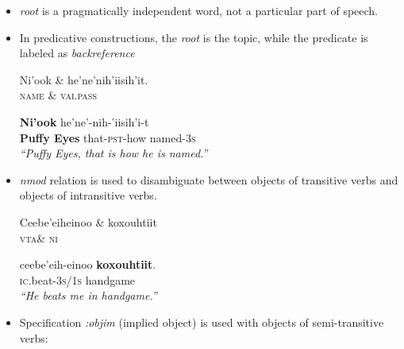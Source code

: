 \documentclass[portrait,a0paper,fontscale=0.36]{baposter} %
\newcommand{\compresslist}{ %
\setlength{\itemsep}{1pt}
\setlength{\parskip}{0pt}
\setlength{\parsep}{0pt}
}
\begin{document}
\begin{poster}
{\begin{itemize}
\normalsize
\end{itemize}
}
{\vspace{8px}
\begin{itemize} 
\item \textit{root} is a pragmatically independent word, not a particular part of speech.
\item In predicative constructions, the \textit{root} is the topic, while the predicate is labeled as \textit{backreference}
\begin{exe}
\ex \label{topic}
\footnotesize
\begin{dependency}
\begin{deptext}
Ni'ook \& he'ne'nih'iisih'it.\\
\textsc{name} \& \textsc{vai.pass}\\
\end{deptext}
\end{dependency}
\gll \textbf{{Ni'ook}} {he'ne'-nih-'iisih'i-t}\\
\textbf{{Puffy Eyes}} {that-\textsc{pst}-how named-\textsc{3s}}\\
\trans \textit{``Puffy Eyes, that is how he is named.''}

\end{exe}
\normalsize

\end{itemize}
}


{
\begin{itemize} \compresslist
\item \textit{nmod} relation is used to disambiguate between objects of transitive verbs and objects of intransitive verbs. 
\small
\begin{exe}
\ex \label{handgame} 
\begin{dependency}
\begin{deptext}
Ceebe'eiheinoo \& koxouhtiit\\
\textsc{vta}\& \textsc{ni}\\
\end{deptext}
\end{dependency}
\gll ceebe'eih-einoo \textbf{koxouhtiit}.\\
\textsc{ic}.beat-\textsc{3s/1s} handgame\\
\trans \textit{``He beats me in handgame.''}
\end{exe}
\normalsize
\item Specification \textit{:objim} (implied object) is used with objects of semi-transitive verbs:


\end{itemize}}
\end{poster}
\end{document}
